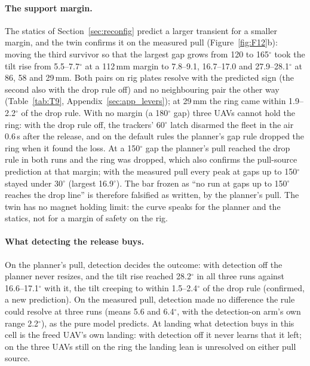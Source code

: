 \paragraph{The support margin.} The statics of Section~\ref{sec:reconfig} predict a larger transient for a smaller
margin, and the twin confirms it on the measured pull (Figure~\ref{fig:F12}b): moving the third survivor so that the
largest gap grows from 120 to 165$^\circ$ took the tilt rise from 5.5--7.7$^\circ$ at a 112\,mm margin to 7.8--9.1,
16.7--17.0 and 27.9--28.1$^\circ$ at 86, 58 and 29\,mm. Both pairs on rig plates resolve with the predicted sign (the second also with the drop
rule off) and no neighbouring pair the other way (Table~\ref{tab:T9}, Appendix~\ref{sec:app_levers}); at 29\,mm the ring came within
1.9--2.2$^\circ$ of the drop rule. With no margin (a 180$^\circ$
gap) three UAVs cannot hold the ring: with the drop rule off, the trackers' 60$^\circ$ latch disarmed the fleet in the
air 0.6\,s after the release, and on the default rules the planner's gap rule dropped the ring when it found the loss. At a 150$^\circ$ gap the planner's pull reached the drop rule in both runs and the ring was
dropped, which also confirms the pull-source prediction at that margin; with the measured pull every peak at gaps up
to 150$^\circ$ stayed under 30$^\circ$ (largest 16.9$^\circ$). The bar frozen as ``no run at gaps up to 150$^\circ$
reaches the drop line'' is therefore falsified as written, by the planner's pull. The twin has no magnet holding limit:
the curve speaks for the planner and the statics, not for a margin of safety on the rig.

\paragraph{What detecting the release buys.} On the planner's pull, detection decides the outcome: with detection off
the planner never resizes, and the tilt rise reached 28.2$^\circ$ in all three runs against 16.6--17.1$^\circ$ with it,
the tilt creeping to within 1.5--2.4$^\circ$ of the drop rule (confirmed, a new prediction). On the measured pull,
detection made no difference the rule could resolve at three runs (means 5.6 and 6.4$^\circ$, with the detection-on
arm's own range 2.2$^\circ$), as the pure model predicts. At landing what detection buys in this cell is the freed UAV's own landing: with detection off it never learns that it
left; on the three UAVs still on the ring the landing lean is unresolved on either pull source.

